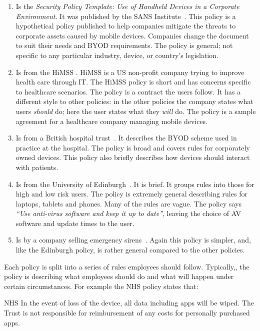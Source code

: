 \documentclass[thesis.tex]{subfiles}
\begin{document}
\begin{enumerate}
\item Is the \emph{Security Policy Template: Use of Handheld Devices
    in a Corporate Environment}. It was published by the SANS
  Institute~\cite{nicholas_r._c._guerin_security_2008}. This policy is a
  hypothetical policy published to help companies mitigate the threats
  to corporate assets caused by mobile devices. Companies change the
  document to suit their needs and BYOD requirements. The policy is
  general; not specific to any particular industry, device, or country's
  legislation.
\item Is from the \ac{HiMSS}
  \cite{healthcare_information_and_management_systems_society_mobile_2012}.
  \ac{HiMSS} is a US non-profit company trying to improve health care through IT.
  The \ac{HiMSS} policy is short and has concerns specific to
  healthcare scenarios. The policy is a contract the users follow. It has
  a different style to other policies: in the other policies the company states
  what users \emph{should} do; here the user states what they \emph{will} do. The policy is
  a sample agreement for a healthcare company managing mobile
  devices.
\item Is from a British hospital trust~\cite{kennington_mobiles_2014}.
  It describes the BYOD scheme used in practice at the hospital.  The
  policy is broad and covers rules for corporately owned devices.  This
  policy also briefly describes how devices should interact with
  patients.
\item Is from the University of
  Edinburgh~\cite{williamson_bring_2015}. It is brief. It groups
  rules into those for high and low risk users.  The policy is extremely general describing rules for
  laptops, tablets and phones.  Many of the rules are vague.
  The policy says \emph{``Use anti-virus software and keep it up
    to date''}, leaving the choice of AV software and
  update times to the user.
\item Is by a company selling emergency
  sirens~\cite{code3pse.org_sample_nodate}. Again this policy is simpler,
  and, like the Edinburgh policy, is rather general compared to the other policies.
\end{enumerate}

Each policy is split into a series of rules employees
should follow. Typically,, the policy is describing what employees should
do and what will happen under certain circumstances. For example the NHS policy
states that:

\begin{policyrule}{NHS}
  In the event of loss of the device, all data including apps will be wiped. The Trust
  is not responsible for reimbursement of any costs for personally purchased apps.
\end{policyrule}
\end{document}
